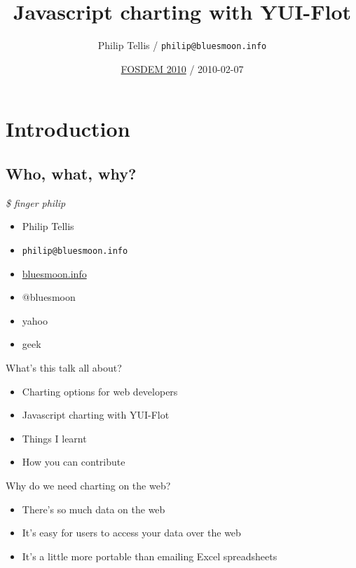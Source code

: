 \documentclass{beamer}
\author{Philip Tellis / \texttt{philip@bluesmoon.info}}
\title{Javascript charting with YUI-Flot}
\date{\href{http://fosdem.org/2010/}{FOSDEM 2010} / 2010-02-07}
\begin{document}
\begin{frame}
  \titlepage
\end{frame}


\section{Introduction}
\subsection{Who, what, why?}

\begin{frame}{\textit{\$ finger philip}}
  \begin{itemize}
  \item Philip Tellis
  \item \small{\texttt{philip@bluesmoon.info}}
  \item \href{http://bluesmoon.info/}{bluesmoon.info}
  \item @bluesmoon
  \item yahoo
  \item geek
  \end{itemize}
\end{frame}

\begin{frame}{What's this talk all about?}
  \begin{itemize}
  \item Charting options for web developers
  \item Javascript charting with YUI-Flot
  \item Things I learnt
  \item How you can contribute
  \end{itemize}
\end{frame}

\begin{frame}{Why do we need charting on the web?}
  \begin{itemize}
  \item There's so much data on the web
  \item<2-> It's easy for users to access your data over the web
  \item<3-> It's a little more portable than emailing Excel spreadsheets
  \end{itemize}
\end{frame}
\end{document}
